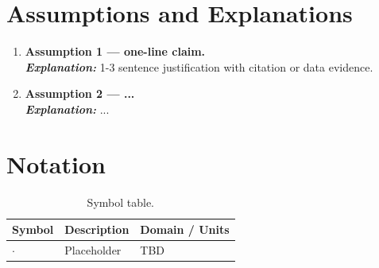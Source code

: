 \section{Assumptions and Explanations}
\begin{enumerate}
    \item \textbf{Assumption 1 — one-line claim.}\\
    \textbf{\textit{Explanation:}} 1-3 sentence justification with citation or data evidence.
    \item \textbf{Assumption 2 — ...}\\
    \textbf{\textit{Explanation:}} ...
\end{enumerate}

\section{Notation}
\begin{table}[H]
    \centering
    \caption{Symbol table.}
    \label{tab:notation}
    \begin{tabular}{l l l}
        \hline
        Symbol & Description & Domain / Units \\
        \hline
        $\cdot$ & Placeholder & TBD \\
        \hline
    \end{tabular}
\end{table}

